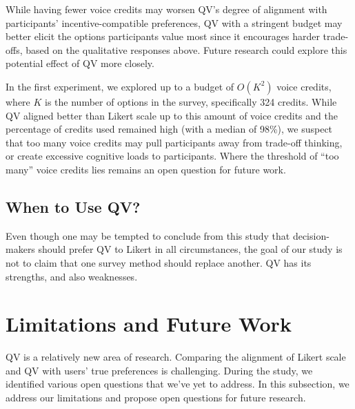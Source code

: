 While having fewer voice credits may worsen QV's degree of alignment with participants' incentive-compatible preferences, QV with a stringent budget may better elicit the options participants value most since it encourages harder trade-offs, based on the qualitative responses above. Future research could explore this potential effect of QV more closely.

In the first experiment, we explored up to a budget of $O(K^{2})$ voice credits, where $K$ is the number of options in the survey, specifically 324 credits. While QV aligned better than Likert scale up to this amount of voice credits and the percentage of credits used remained high (with a median of 98\%), we suspect that too many voice credits may pull participants away from trade-off thinking, or create excessive cognitive loads to participants. Where the threshold of ``too many'' voice credits lies remains an open question for future work.

\subsection{When to Use QV?}
Even though one may be tempted to conclude from this study that decision-makers should prefer QV to Likert in all circumstances, the goal of our study is not to claim that one survey method should replace another. QV has its strengths, and also weaknesses. 

{}

\section{Limitations and Future Work}
QV is a relatively new area of research. Comparing the alignment of Likert scale and QV with users' true preferences is challenging. During the study, we identified various open questions that we've yet to address. In this subsection, we address our limitations and propose open questions for future research. 

